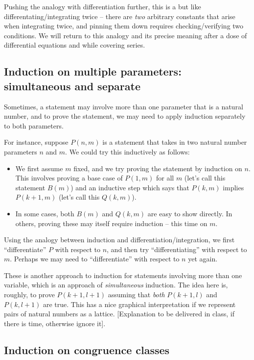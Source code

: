 \documentclass{amsart}
\begin{document}
Pushing the analogy with differentiation further, this is a but like
differentating/integrating twice -- there are {\em two} arbitrary
constants that arise when integrating twice, and pinning them down
requires checking/verifying two conditions. We will return to this
analogy and its precise meaning after a dose of differential equations
and while covering series.

\subsection{Induction on multiple parameters: simultaneous and separate}

Sometimes, a statement may involve more than one parameter that is a
natural number, and to prove the statement, we may need to apply
induction separately to both parameters.

For instance, suppose $P(n,m)$ is a statement that takes in two
natural number parameters $n$ and $m$. We could try this inductively
as follows:

\begin{itemize}
\item We first assume $m$ fixed, and we try proving the statement by
  induction on $n$. This involves proving a base case of $P(1,m)$ for
  all $m$ (let's call this statement $B(m)$) and an inductive step
  which says that $P(k,m)$ implies $P(k +1,m)$ (let's call this
  $Q(k,m)$).
\item In some cases, both $B(m)$ and $Q(k,m)$ are easy to show
  directly. In others, proving these may itself require induction --
  this time on $m$.
\end{itemize}

Using the analogy between induction and differentiation/integration,
we first ``differentiate'' $P$ with respect to $n$, and then try
``differentiating'' with respect to $m$. Perhaps we may need to
``differentiate'' with respect to $n$ yet again.

These is another approach to induction for statements involving more
than one variable, which is an approach of {\em simultaneous}
induction. The idea here is, roughly, to prove $P(k+1,l+1)$ assuming
that {\em both} $P(k+1,l)$ and $P(k,l+1)$ are true. This has a nice
graphical interpretation if we represent pairs of natural numbers as a
lattice. [Explanation to be delivered in class, if there is time,
otherwise ignore it].

\subsection{Induction on congruence classes}
\end{document}
